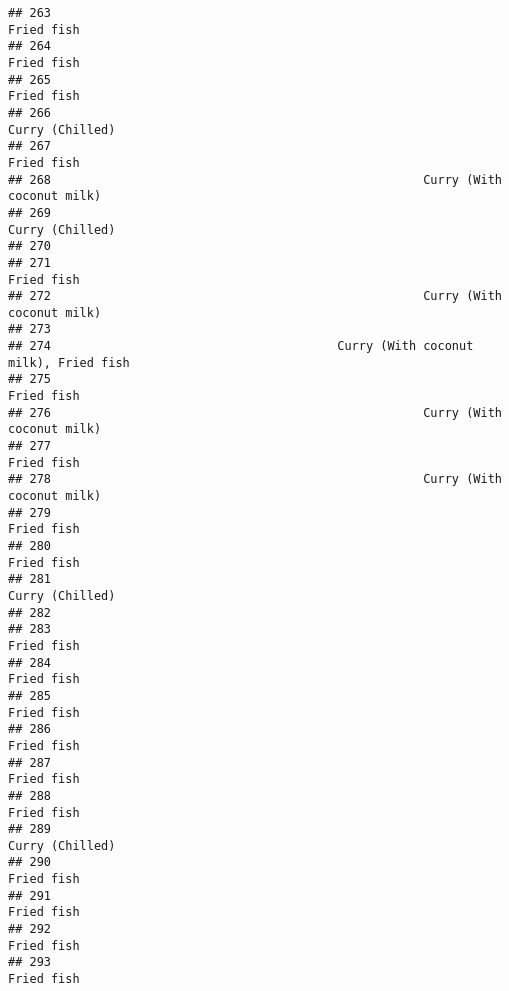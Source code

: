 \documentclass[
]{article}
\begin{document}
\begin{verbatim}
## 263                                                                   Fried fish
## 264                                                                   Fried fish
## 265                                                                   Fried fish
## 266                                                              Curry (Chilled)
## 267                                                                   Fried fish
## 268                                                    Curry (With coconut milk)
## 269                                                              Curry (Chilled)
## 270                                                                             
## 271                                                                   Fried fish
## 272                                                    Curry (With coconut milk)
## 273                                                                             
## 274                                        Curry (With coconut milk), Fried fish
## 275                                                                   Fried fish
## 276                                                    Curry (With coconut milk)
## 277                                                                   Fried fish
## 278                                                    Curry (With coconut milk)
## 279                                                                   Fried fish
## 280                                                                   Fried fish
## 281                                                              Curry (Chilled)
## 282                                                                             
## 283                                                                   Fried fish
## 284                                                                   Fried fish
## 285                                                                   Fried fish
## 286                                                                   Fried fish
## 287                                                                   Fried fish
## 288                                                                   Fried fish
## 289                                                              Curry (Chilled)
## 290                                                                   Fried fish
## 291                                                                   Fried fish
## 292                                                                   Fried fish
## 293                                                                   Fried fish

\end{verbatim}
\end{document}
